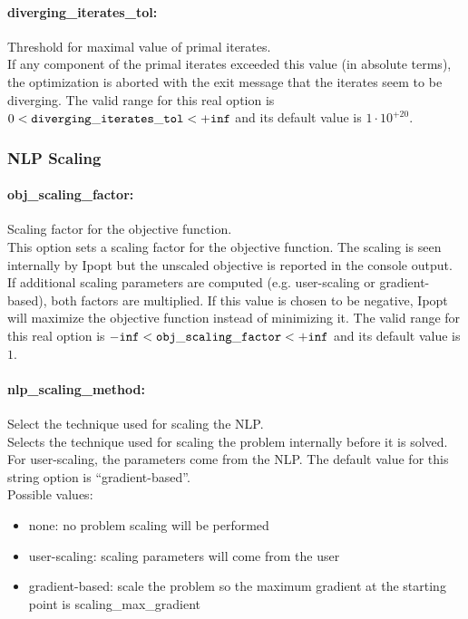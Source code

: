\paragraph{diverging\_iterates\_tol:} Threshold for maximal value of primal iterates. $\;$ \\
 If any component of the primal iterates exceeded
this value (in absolute terms), the optimization
is aborted with the exit message that the
iterates seem to be diverging. The valid range for this real option is 
$0 <  {\tt diverging\_iterates\_tol } <  {\tt +inf}$
and its default value is $1 \cdot 10^{+20}$.

\subsubsection{NLP Scaling}

\paragraph{obj\_scaling\_factor:} Scaling factor for the objective function. $\;$ \\
 This option sets a scaling factor for the
objective function. The scaling is seen
internally by Ipopt but the unscaled objective is
reported in the console output. If additional
scaling parameters are computed (e.g.
user-scaling or gradient-based), both factors are
multiplied. If this value is chosen to be
negative, Ipopt will maximize the objective
function instead of minimizing it. The valid range for this real option is 
${\tt -inf} <  {\tt obj\_scaling\_factor } <  {\tt +inf}$
and its default value is $1$.


\paragraph{nlp\_scaling\_method:} Select the technique used for scaling the NLP. $\;$ \\
 Selects the technique used for scaling the
problem internally before it is solved. For
user-scaling, the parameters come from the NLP.
The default value for this string option is ``gradient-based''.
\\ 
Possible values:
\begin{itemize}
   \item none: no problem scaling will be performed
   \item user-scaling: scaling parameters will come from the user
   \item gradient-based: scale the problem so the maximum gradient at
the starting point is scaling\_max\_gradient
\end{itemize}

